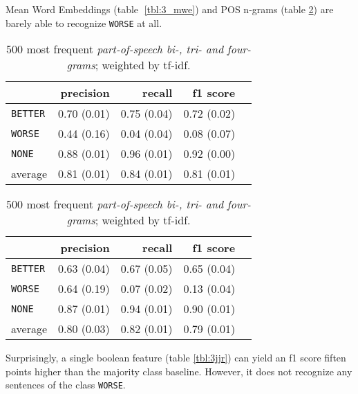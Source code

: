 Mean Word Embeddings (table \ref{tbl:3_mwe}) and POS n-grams (table \ref{tbl:ngram_3}) are barely able to recognize \texttt{WORSE} at all.

\begin{table}[h]
    \begin{minipage}{.5\linewidth}
   \caption{ \emph{Mean Word Embeddings} for the middle part of the sentence. } 
    \label{tbl:3_mwe}
\begin{tabular}{@{}lrrrr@{}}
\toprule
 	&	 precision &	 recall &	 f1 score  \\ \midrule 
\texttt{BETTER}	&	 0.70 \scriptsize{(0.01)} &	 0.75 \scriptsize{(0.04)} &	 0.72 \scriptsize{(0.02)}  \\ 
\texttt{WORSE}	&	 0.44 \scriptsize{(0.16)} &	 0.04 \scriptsize{(0.04)} &	 0.08 \scriptsize{(0.07)}  \\ 
\texttt{NONE}	&	 0.88 \scriptsize{(0.01)} &	 0.96 \scriptsize{(0.01)} &	 0.92 \scriptsize{(0.00)}  \\ 
average	&	 0.81 \scriptsize{(0.01)} &	 0.84 \scriptsize{(0.01)} &	 0.81 \scriptsize{(0.01)}  \\ 
\bottomrule
\end{tabular}
  \end{minipage} \hfill
    \begin{minipage}{.5\linewidth}
  
     \caption{500 most frequent \emph{part-of-speech bi-, tri- and four-grams}; weighted by tf-idf.} 
       \label{tbl:ngram_3}
\begin{tabular}{@{}lrrrr@{}}
\toprule
 	&	 precision &	 recall &	 f1 score  \\ \midrule 
\texttt{BETTER}	&	 0.63 \scriptsize{(0.04)} &	 0.67 \scriptsize{(0.05)} &	 0.65 \scriptsize{(0.04)}  \\ 
\texttt{WORSE}	&	 0.64 \scriptsize{(0.19)} &	 0.07 \scriptsize{(0.02)} &	 0.13 \scriptsize{(0.04)}  \\ 
\texttt{NONE}	&	 0.87 \scriptsize{(0.01)} &	 0.94 \scriptsize{(0.01)} &	 0.90 \scriptsize{(0.01)}  \\ 
average	&	 0.80 \scriptsize{(0.03)} &	 0.82 \scriptsize{(0.01)} &	 0.79 \scriptsize{(0.01)}  \\ 
\bottomrule
\end{tabular}
    \end{minipage} 
\end{table}


Surprisingly, a single boolean feature (table \ref{tbl:3jjr}) can yield an f1 score fiften points higher than the majority class baseline. However, it does not recognize any sentences of the class \texttt{WORSE}.

